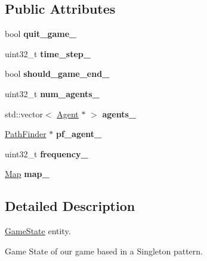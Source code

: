 \subsection*{Public Attributes}
\begin{DoxyCompactItemize}
\item 
\mbox{\label{class_game_state_a17236a9e4ddb53287504198a88c97c59}} 
bool {\bfseries quit\+\_\+game\+\_\+}
\item 
\mbox{\label{class_game_state_ac9369dd597cc6276eb96f79c6ebc9ad9}} 
uint32\+\_\+t {\bfseries time\+\_\+step\+\_\+}
\item 
\mbox{\label{class_game_state_acc35df1f7209e70cbaf971c5128f80cf}} 
bool {\bfseries should\+\_\+game\+\_\+end\+\_\+}
\item 
\mbox{\label{class_game_state_a6fc6e976bb05ff22a8a74eb9f2686685}} 
uint32\+\_\+t {\bfseries num\+\_\+agents\+\_\+}
\item 
\mbox{\label{class_game_state_a25827355b9612be2b489fc41005ea507}} 
std\+::vector$<$ \mbox{\hyperlink{class_agent}{Agent}} $\ast$ $>$ {\bfseries agents\+\_\+}
\item 
\mbox{\label{class_game_state_a150f360e36f3cdf05f2e152d2bd5794f}} 
\mbox{\hyperlink{class_path_finder}{Path\+Finder}} $\ast$ {\bfseries pf\+\_\+agent\+\_\+}
\item 
\mbox{\label{class_game_state_afd22b13f977d8a6d7ff498c1a38b7845}} 
uint32\+\_\+t {\bfseries frequency\+\_\+}
\item 
\mbox{\label{class_game_state_aefad3dbb84fd867356a4948be3ce44ba}} 
\mbox{\hyperlink{class_map}{Map}} {\bfseries map\+\_\+}
\end{DoxyCompactItemize}


\subsection{Detailed Description}
\mbox{\hyperlink{class_game_state}{Game\+State}} entity. 

Game State of our game based in a Singleton pattern. 

